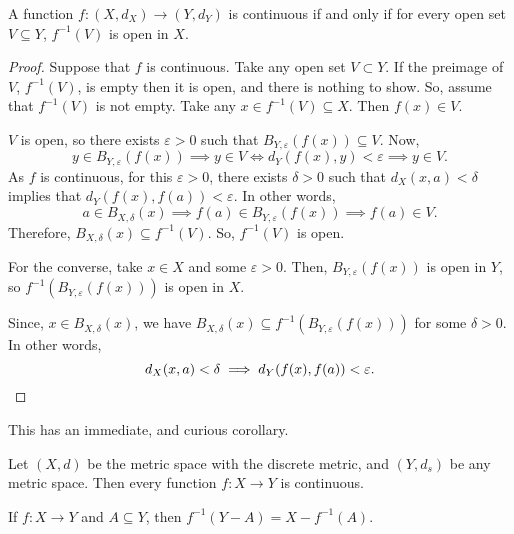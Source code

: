 \documentclass[draft]{penrose}
\newcommand{\oB}{B}
\begin{document}
\begin{nthm}
  A function $f:(X, d_X) \to (Y, d_Y)$ is continuous if and only if for every open set $V \subseteq Y$, $f^{-1}(V)$ is open in $X$.
\end{nthm}
\begin{proof}
  Suppose that $f$ is continuous. Take any open set $V \subset Y$. If the preimage of $V$, $f^{-1}(V)$, is empty then it is open, and there is nothing to show. So, assume that $f^{-1}(V)$ is not empty. Take any $x \in f^{-1}(V) \subseteq X$. Then $f(x) \in V$.

  $V$ is open, so there exists $\varepsilon > 0$ such that $\oB_{Y,\varepsilon}(f(x)) \subseteq V$. Now,
  \begin{equation*}
    y \in \oB_{Y,\varepsilon}(f(x)) \implies y \in V
    \iff d_{Y}(f(x),y) < \varepsilon \implies y \in V.
  \end{equation*}
  As $f$ is continuous, for this $\varepsilon>0$, there exists $\delta>0$ such that $d_{X}(x,a) < \delta$ implies that $d_{Y}(f(x),f(a))<\varepsilon$. In other words,
  \begin{equation*}
    a \in \oB_{X,\delta}(x) \implies f(a) \in\oB_{Y,\varepsilon}(f(x)) \implies f(a) \in V.
  \end{equation*}
  Therefore, $\oB_{X,\delta}(x) \subseteq f^{-1}(V)$. So, $f^{-1}(V)$ is open.

  For the converse, take $x \in X$ and some $\varepsilon>0$. Then, $B_{Y, \varepsilon}(f(x))$ is open in $Y$, so $f^{-1}(B_{Y, \varepsilon}(f(x)))$ is open in $X$.

  Since, $x \in B_{X,\delta}(x)$, we have $B_{X,\delta}(x) \subseteq f^{-1}(B_{Y, \varepsilon}(f(x)))$ for some $\delta>0$. In other words,
  \begin{equation*}
    d_{X}(x,a) < \delta \implies d_{Y}(f(x), f(a)) < \varepsilon.\qedhere
  \end{equation*}
\end{proof}

This has an immediate, and curious corollary.
\begin{ncor}
  Let $(X,d)$ be the metric space with the discrete metric, and $(Y,d_s)$ be any metric space. Then every function $f: X \to Y$ is continuous.
\end{ncor}

\begin{nlemma}
  If $f:X \to Y$ and $A \subseteq Y$, then $f^{-1}(Y-A)=X-f^{-1}(A)$.
\end{nlemma}
\end{document}
